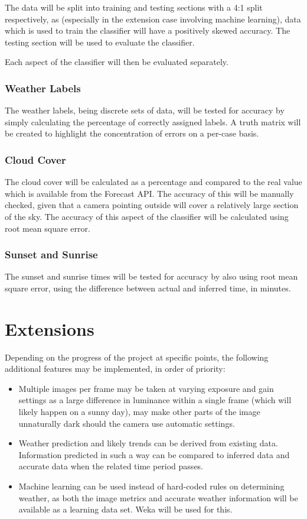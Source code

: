 \documentclass[12pt]{article}
\begin{document}
The data will be split into training and testing sections with a 4:1 split respectively, as (especially in the extension case involving machine learning), data which is used to train the classifier will have a positively skewed accuracy. The testing section will be used to evaluate the classifier.

Each aspect of the classifier will then be evaluated separately.

\subsubsection*{Weather Labels}

The weather labels, being discrete sets of data, will be tested for accuracy by simply calculating the percentage of correctly assigned labels. A truth matrix will be created to highlight the concentration of errors on a per-case basis.

\subsubsection*{Cloud Cover}

The cloud cover will be calculated as a percentage and compared to the real value which is available from the Forecast API. The accuracy of this will be manually checked, given that a camera pointing outside will cover a relatively large section of the sky. The accuracy of this aspect of the classifier will be calculated using root mean square error.

\subsubsection*{Sunset and Sunrise}

The sunset and sunrise times will be tested for accuracy by also using root mean square error, using the difference between actual and inferred time, in minutes.

\section*{Extensions}
Depending on the progress of the project at specific points, the following additional features may be implemented, in order of priority:
\begin{itemize}
	\item Multiple images per frame may be taken at varying exposure and gain settings as a large difference in luminance within a single frame (which will likely happen on a sunny day), may make other parts of the image unnaturally dark should the camera use automatic settings.
	\item Weather prediction and likely trends can be derived from existing data. Information predicted in such a way can be compared to inferred data and accurate data when the related time period passes.
	\item Machine learning can be used instead of hard-coded rules on determining weather, as both the image metrics and accurate weather information will be available as a learning data set. Weka will be used for this.
\end{itemize}
\end{document}
